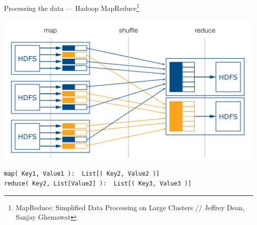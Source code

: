 \documentclass[aspectratio=1610]{beamer}
\begin{document}
\begin{frame}[fragile]{Processing the data --- Hadoop MapReduce\footnote{MapReduce: Simplified Data Processing on Large Clusters // Jeffrey Dean, Sanjay Ghemawat}}

\begin{center}
\includegraphics[scale=0.16]{images/mr.png}
\end{center}
\begin{verbatim}
map( Key1, Value1 ):  List[( Key2, Value2 )]
reduce( Key2, List[Value2] ):  List[( Key3, Value3 )]

\end{verbatim}

\end{frame}
\end{document}
